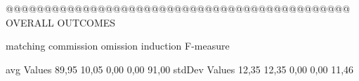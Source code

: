  @@@@@@@@@@@@@@@@@@@@@@@@@@@@@@@@@@@@@@@@@@@@@ OVERALL OUTCOMES

                matching commission   omission  induction   F-measure

avg Values       89,95       10,05       0,00       0,00       91,00        
stdDev Values    12,35       12,35       0,00       0,00        11,46        
